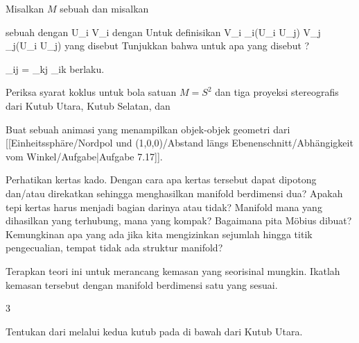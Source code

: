 {}
{

Misalkan $M$ sebuah
dan misalkan

 sebuah
dengan
 {U_i } { V_i
} {}
dengan
 Untuk
 definisikan
 {V_i \cap \alpha_i(U_i \cap U_j)  } { V_j \cap \alpha_j(U_i \cap U_j)
} {}
yang disebut
Tunjukkan bahwa untuk
 apa yang disebut  {}
 {?} {}

\mavergleichskettedisp
{\vergleichskette
{ \varphi_{ij}
}
{ =} {\varphi_{kj} \circ \varphi_{ik}
}
{ } {
}
{ } {
}
{ } {
}
}
{}{}{}
berlaku.

}
{} {}

{}
{

Periksa syarat koklus
 {} {}
untuk bola satuan $M=S^2$ dan tiga proyeksi stereografis dari Kutub Utara, Kutub Selatan, dan

}
{} {}

{}
{

Buat sebuah animasi yang menampilkan objek-objek geometri dari
[[Einheitssphäre/Nordpol und (1,0,0)/Abstand längs Ebenenschnitt/Abhängigkeit vom Winkel/Aufgabe|Aufgabe 7.17]].

}
{} {}

{}
{

Perhatikan kertas kado. Dengan cara apa kertas tersebut dapat dipotong dan/atau direkatkan sehingga menghasilkan manifold berdimensi dua? Apakah tepi kertas harus menjadi bagian darinya atau tidak? Manifold mana yang dihasilkan yang terhubung, mana yang kompak? Bagaimana pita Möbius dibuat? Kemungkinan apa yang ada jika kita mengizinkan sejumlah hingga titik pengecualian, tempat tidak ada struktur manifold?

Terapkan teori ini untuk merancang kemasan yang seorisinal mungkin. Ikatlah kemasan tersebut dengan manifold berdimensi satu yang sesuai.

}
{} {}


{3}
{

Tentukan
 dari
melalui kedua kutub pada
 di bawah
dari Kutub Utara.

}
{} {}

